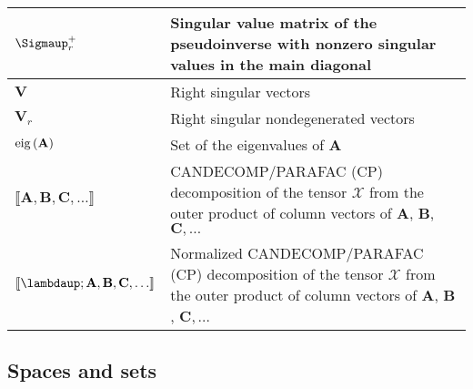 \documentclass{article}
\begin{document}
\begin{xltabular}{\textwidth}{XX}
	\(\boldsymbol{\Sigmaup}^{+}_r\)                                                             & Singular value matrix of the pseudoinverse with nonzero singular values in the main diagonal                                                                                         \\ \hline
	\(\mathbf{V}\)                                                                              & Right singular vectors \cite{strangIntroductionLinearAlgebra1993}                                                                                                                    \\ \hline
	\(\mathbf{V}_r\)                                                                            & Right singular nondegenerated vectors                                                                                                                                                \\ \hline
	\(\operatorname{eig}\left(\mathbf{A}\right)\)                                                                        & Set of the eigenvalues of \(\mathbf{A}\) \cite{chellappaSignalProcessingTheory2014,leon-garciaProbabilityStatisticsRandom2007,petersenMatrixCookbook2008}                            \\ \hline
	\(\llbracket \mathbf{A}, \mathbf{B}, \mathbf{C}, \dots \rrbracket\)                         & CANDECOMP/PARAFAC (CP) decomposition of the tensor \(\bm{\mathcal{X}}\) from the outer product of column vectors of \(\mathbf{A}\), \(\mathbf{B}\), \(\mathbf{C}, \dots\)            \\ \hline
	\(\llbracket \boldsymbol{\lambdaup}; \mathbf{A}, \mathbf{B}, \mathbf{C}, \dots \rrbracket\) & Normalized CANDECOMP/PARAFAC (CP) decomposition of the tensor \(\bm{\mathcal{X}}\) from the outer product of column vectors of \(\mathbf{A}\), \(\mathbf{B}\), \(\mathbf{C}, \dots\) \\
\end{xltabular}
\subsection{Spaces and sets}
\end{document}

